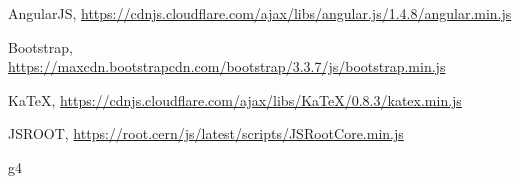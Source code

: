 \begin{thebibliography}{}
%
%
AngularJS, \url{https://cdnjs.cloudflare.com/ajax/libs/angular.js/1.4.8/angular.min.js}

Bootstrap, \url{https://maxcdn.bootstrapcdn.com/bootstrap/3.3.7/js/bootstrap.min.js}

KaTeX, \url{https://cdnjs.cloudflare.com/ajax/libs/KaTeX/0.8.3/katex.min.js}

JSROOT, \url{https://root.cern/js/latest/scripts/JSRootCore.min.js}

g4


\end{thebibliography}